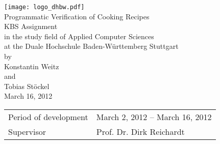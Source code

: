 \begin{titlepage}

  \begin{center}
    \texttt{[image: logo\_dhbw.pdf]}\\[3cm]
  
    {\Large Programmatic Verification of Cooking Recipes} \\[1.5cm]
    {\LARGE KBS Assignment} \\[1cm]
    {\large in the study field of Applied Computer Sciences} \\[0.5cm]
    {\large at the Duale Hochschule Baden-Württemberg Stuttgart} \\[1.5cm]
    {\large by} \\[0.5cm]
    {\Large Konstantin Weitz} \\[0.2cm]
    {\large and} \\[0.2cm]
    {\Large Tobias Stöckel} \\[1.75cm]
    {\large March 16, 2012}
    \vfill
    \begin{tabularx}{\textwidth}{ X X }
      Period of development & March 2, 2012 -- March 16, 2012 \\
      Supervisor & Prof. Dr. Dirk Reichardt \\
    \end{tabularx}
  \end{center}

\end{titlepage}